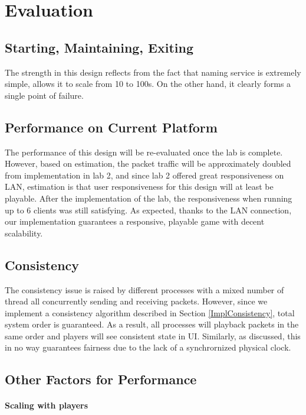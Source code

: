 \section{Evaluation}\label{Evaluation}

\subsection{Starting, Maintaining, Exiting}

The strength in this design reflects from the fact that naming service is extremely simple, allows it to scale from 10 to 100s. On the other hand, it clearly forms a single point of failure.

\subsection{Performance on Current Platform}

The performance of this design will be re-evaluated once the lab is complete. However, based on estimation, the packet traffic will be approximately doubled from implementation in lab 2, and since lab 2 offered great responsiveness on LAN, estimation is that user responsiveness for this design will at least be playable. After the implementation of the lab, the responsiveness when running up to 6 clients was still satisfying. As expected, thanks to the LAN connection, our implementation guarantees a responsive, playable game with decent scalability.

\subsection{Consistency}

The consistency issue is raised by different processes with a mixed number of thread all concurrently sending and receiving packets. However, since we implement a consistency algorithm described in Section \ref{ImplConsistency}, total system order is guaranteed. As a result, all processes will playback packets in the same order and players will see consistent state in UI. Similarly, as discussed, this in no way guarantees fairness due to the lack of a synchrornized physical clock.

\subsection{Other Factors for Performance}

\paragraph*{Scaling with players}

